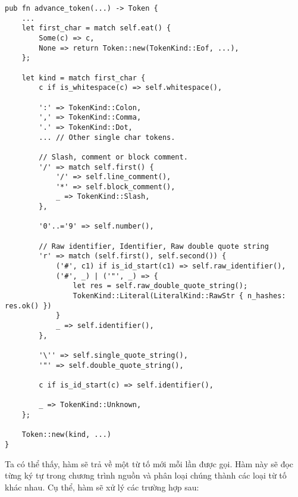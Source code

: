 \begin{lstlisting}[]
pub fn advance_token(...) -> Token {
    ...
    let first_char = match self.eat() {
        Some(c) => c,
        None => return Token::new(TokenKind::Eof, ...),
    };

    let kind = match first_char {
        c if is_whitespace(c) => self.whitespace(),

        ':' => TokenKind::Colon,
        ',' => TokenKind::Comma,
        '.' => TokenKind::Dot,
        ... // Other single char tokens.

        // Slash, comment or block comment.
        '/' => match self.first() {
            '/' => self.line_comment(),
            '*' => self.block_comment(),
            _ => TokenKind::Slash,
        },

        '0'..='9' => self.number(),

        // Raw identifier, Identifier, Raw double quote string
        'r' => match (self.first(), self.second()) {
            ('#', c1) if is_id_start(c1) => self.raw_identifier(),
            ('#', _) | ('"', _) => {
                let res = self.raw_double_quote_string();
                TokenKind::Literal(LiteralKind::RawStr { n_hashes: res.ok() })
            }
            _ => self.identifier(),
        },

        '\'' => self.single_quote_string(),
        '"' => self.double_quote_string(),

        c if is_id_start(c) => self.identifier(),

        _ => TokenKind::Unknown,
    };

    Token::new(kind, ...)
}
\end{lstlisting}

    Ta có thể thấy, hàm  sẽ trả về một từ tố mới mỗi lần được gọi. Hàm này sẽ đọc từng ký tự trong chương trình nguồn và phân loại chúng thành các loại từ tố khác nhau. Cụ thể, hàm sẽ xử lý các trường hợp sau:

